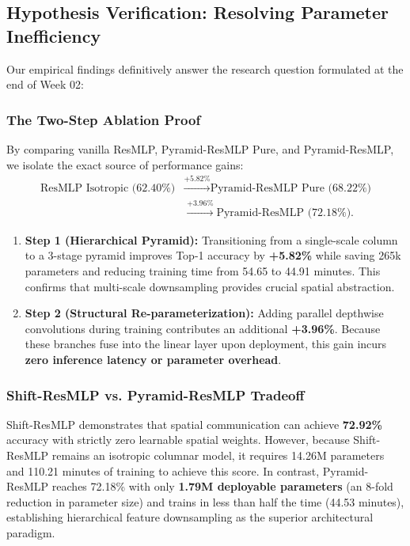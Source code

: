 \subsection{Hypothesis Verification: Resolving Parameter Inefficiency}
Our empirical findings definitively answer the research question formulated at the end of Week 02:

\subsubsection{The Two-Step Ablation Proof}
By comparing vanilla ResMLP, Pyramid-ResMLP Pure, and Pyramid-ResMLP, we isolate the exact source of performance gains:
\begin{align}
\text{ResMLP Isotropic (62.40\%)} &\xrightarrow{\mathbf{+5.82\%}} \text{Pyramid-ResMLP Pure (68.22\%)} \nonumber \\
&\xrightarrow{\mathbf{+3.96\%}} \text{Pyramid-ResMLP (72.18\%)}.
\end{align}
\begin{enumerate}
    \item \textbf{Step 1 (Hierarchical Pyramid):} Transitioning from a single-scale column to a 3-stage pyramid improves Top-1 accuracy by \textbf{+5.82\%} while saving 265k parameters and reducing training time from 54.65 to 44.91 minutes. This confirms that multi-scale downsampling provides crucial spatial abstraction.
    \item \textbf{Step 2 (Structural Re-parameterization):} Adding parallel depthwise convolutions during training contributes an additional \textbf{+3.96\%}. Because these branches fuse into the linear layer upon deployment, this gain incurs \textbf{zero inference latency or parameter overhead}.
\end{enumerate}

\subsubsection{Shift-ResMLP vs. Pyramid-ResMLP Tradeoff}
Shift-ResMLP demonstrates that spatial communication can achieve \textbf{72.92\%} accuracy with strictly zero learnable spatial weights. However, because Shift-ResMLP remains an isotropic columnar model, it requires 14.26M parameters and 110.21 minutes of training to achieve this score. In contrast, Pyramid-ResMLP reaches 72.18\% with only \textbf{1.79M deployable parameters} (an 8-fold reduction in parameter size) and trains in less than half the time (44.53 minutes), establishing hierarchical feature downsampling as the superior architectural paradigm.
